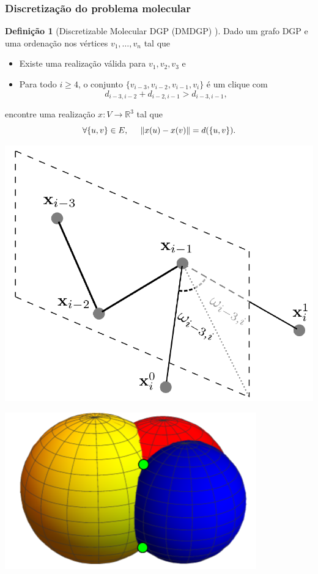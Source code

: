 \documentclass[10pt]{beamer}
\theoremstyle{plain}
\theoremstyle{definition}
\newtheorem{definicao}{Definição}[section]
\begin{document}
	\begin{frame}
		\frametitle{\normalsize Discretização do problema molecular} 
		{
			\small
			\begin{definicao}[Discretizable Molecular DGP (DMDGP) \cite{carlile:MinimalOrder}]
				Dado um grafo DGP e uma ordenação nos vértices $v_1,\dots,v_n$ tal que
				\begin{itemize}
					\item Existe uma realização válida para $v_1, v_2, v_3$ e
					\item Para todo $i \geq 4$, o conjunto $\{v_{i-3}, v_{i-2}, v_{i-1}, v_i\}$ é um clique com $$d_{i-3,i-2} + d_{i-2,i-1} > d_{i-3,i-1},$$
				\end{itemize}
				encontre uma realização $x: V \longrightarrow \mathbb{R}^3$ tal que 
				$$\forall \{u,v\} \in E, \hspace{0.5cm} \lVert x(u) - x(v) \rVert = d(\{u,v\}).$$
			\end{definicao}
			\begin{center}
				\begin{minipage}{0.8\linewidth}
					\hspace{0.05cm}
				\end{minipage}	
				\begin{minipage}{0.3\linewidth}
					\includegraphics[width=0.95\linewidth]{dmdgp.png}
				\end{minipage}
				\begin{minipage}{0.2\linewidth}
					\includegraphics[width=1.2\linewidth]{esferas.png}

\end{minipage}
\end{center}}
\end{frame}
\end{document}
